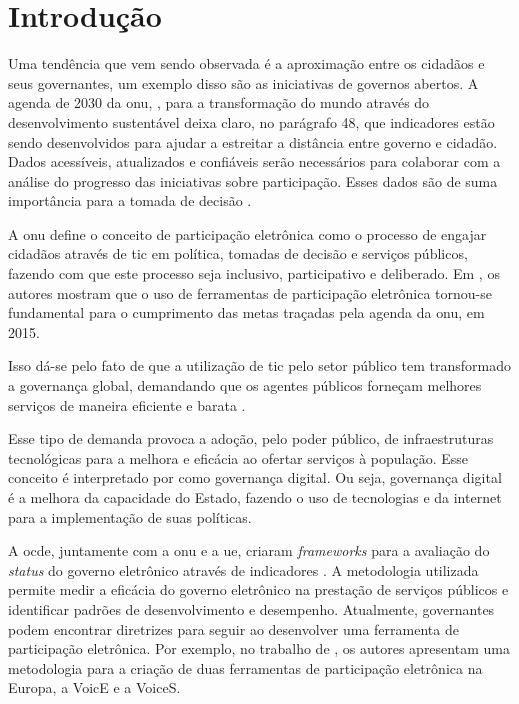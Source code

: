\chapter[Introdução]{Introdução}
\label{cap:cap1}
Uma tendência que vem sendo observada é a aproximação entre os cidadãos e seus governantes, um exemplo disso são as iniciativas de governos abertos.
A agenda de 2030 da \acrfull{onu}, , para a transformação do mundo através do desenvolvimento sustentável deixa claro, no parágrafo 48, que
indicadores estão sendo desenvolvidos para ajudar a estreitar a distância entre governo e cidadão. Dados acessíveis, atualizados e confiáveis serão necessários para colaborar 
com a análise do progresso das iniciativas sobre participação. 
Esses dados são de suma importância para a tomada de decisão \cite{assembly2015transforming}.

\par
A \acrshort{onu} define o conceito de participação eletrônica como o processo de engajar cidadãos através de \acrfull{tic} em política, tomadas de decisão e
serviços públicos, fazendo com que este processo seja inclusivo, participativo e deliberado. Em , os autores mostram que o uso de 
ferramentas de participação eletrônica tornou-se fundamental para o cumprimento das metas traçadas pela agenda da \acrshort{onu}, em 2015. 

\par
Isso dá-se pelo fato de que a utilização de \acrshort{tic} pelo setor público tem transformado a governança global, demandando que os agentes públicos forneçam melhores serviços 
de maneira eficiente e barata \cite{afdb2014uneca}. 

\par
Esse tipo de demanda provoca a adoção, pelo poder público, de infraestruturas tecnológicas para a melhora e eficácia ao ofertar serviços à população. Esse conceito é interpretado
por  como governança digital. Ou seja, governança digital é a melhora da capacidade do Estado, fazendo o uso de tecnologias e da internet 
para a implementação de suas políticas.

\par
A \acrfull{ocde}, juntamente com a \acrshort{onu} e a \acrfull{ue}, criaram \textit{frameworks} para a avaliação do \textit{status} do governo eletrônico através de indicadores \cite{onu2018}. A metodologia utilizada permite medir a eficácia do governo eletrônico na prestação de serviços públicos e identificar padrões de desenvolvimento e desempenho.
Atualmente, governantes podem encontrar diretrizes para seguir ao desenvolver uma ferramenta de participação eletrônica. 
Por exemplo,  no trabalho de , os autores apresentam uma metodologia para a criação de duas ferramentas de participação eletrônica na Europa, a VoicE e a VoiceS.

